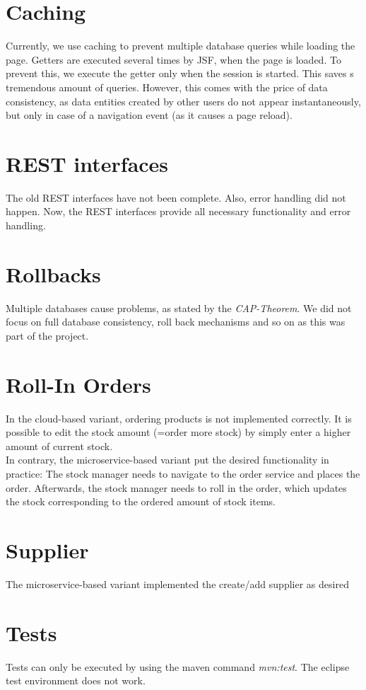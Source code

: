 \section{Caching}
Currently, we use caching to prevent multiple database queries while loading the page. Getters are executed several times by JSF, when the page is loaded. To prevent this, we execute the getter only when the session is started. This saves s tremendous amount of queries. However, this comes with the price of data consistency, as data entities created by other users do not appear instantaneously, but only in case of a navigation event (as it causes a page reload).

\section{REST interfaces}
The old REST interfaces have not been complete. Also, error handling did not happen. Now, the REST interfaces provide all necessary functionality and error handling.

\section{Rollbacks}
Multiple databases cause problems, as stated by the \textit{CAP-Theorem}. We did not focus on full database consistency, roll back mechanisms and so on as this was part of the project. 

\section{Roll-In Orders}
In the cloud-based variant, ordering products is not implemented correctly. It is possible to edit the stock amount (=order more stock) by simply enter a higher amount of current stock. \\
In contrary, the microservice-based variant put the desired functionality in practice: The stock manager needs to navigate to the order service and places the order. Afterwards, the stock manager needs to roll in the order, which updates the stock corresponding to the ordered amount of stock items.

\section{Supplier}
The microservice-based variant implemented the create/add supplier as desired

\section{Tests}
Tests can only be executed by using the maven command \textit{mvn:test}. The eclipse test environment does not work.

